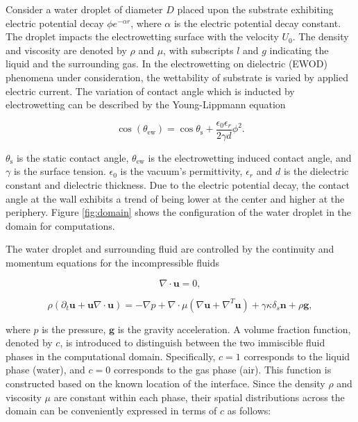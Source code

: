 \documentclass[lineno]{cls/jfm}
\begin{document}
Consider a water droplet of diameter $D$ placed upon the substrate exhibiting electric potential decay $\phi e^{-\alpha r}$, where $\alpha$ is the electric potential decay constant. The droplet impacts the electrowetting surface with the velocity $U_0$. The density and viscosity are denoted by $\rho$ and $\mu$, with subscripts $l$ and $g$ indicating the liquid and the surrounding gas. In the electrowetting on dielectric (EWOD) phenomena under consideration, the wettability of substrate is varied by applied electric current. The variation of contact angle which is inducted by electrowetting can be described by the Young-Lippmann equation

\begin{equation}
	\cos(\theta_{\mathrm{ew}}) = \cos\theta_{\mathrm{s}} + \frac{\epsilon_0 \epsilon_r}{2 \gamma d} \phi^2 .
  \label{Young-Lippmann equation}
\end{equation}

\noindent $\theta_{\mathrm{s}}$ is the static contact angle, $\theta_{\mathrm{ew}}$ is the electrowetting induced contact angle, and $\gamma$ is the surface tension. $\epsilon_0$ is the vacuum's permittivity, $\epsilon_r$ and $d$ is the dielectric constant and dielectric thickness. Due to the electric potential decay, the contact angle at the wall exhibits a trend of being lower at the center and higher at the periphery. Figure \ref{fig:domain} shows the configuration of the water droplet in the domain for computations. 

The water droplet and surrounding fluid are controlled by the continuity and momentum equations for the incompressible fluids

\begin{equation}
  \nabla \cdot \mathbf{u} = 0,
  \label{continuity equation}
\end{equation}

\begin{equation}
  \rho(\partial_t \mathbf{u} + \mathbf{u} \nabla \cdot \mathbf{u})=-\nabla p + \nabla \cdot \mu (\nabla\mathbf{u}+\nabla^T\mathbf{u}) + \gamma \kappa \delta_s \mathbf{n} + \rho \mathbf{g} ,
  \label{momentum equation}
\end{equation}

\noindent where $p$ is the pressure, $\mathbf{g}$ is the gravity acceleration. A volume fraction function, denoted by $c$, is introduced to distinguish between the two immiscible fluid phases in the computational domain. Specifically, $c = 1$ corresponds to the liquid phase (water), and $c = 0$ corresponds to the gas phase (air). This function is constructed based on the known location of the interface. Since the density $\rho$ and viscosity $\mu$ are constant within each phase, their spatial distributions across the domain can be conveniently expressed in terms of $c$ as follows:
\end{document}
